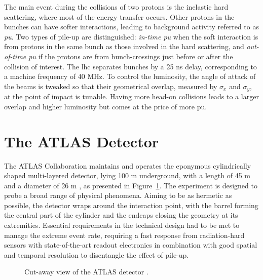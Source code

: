The main event during the collisions of two protons is the inelastic hard scattering, where most of the energy transfer occurs. Other protons in the bunches can have softer interactions, leading to background activity referred to as \textit{\gls{pu}}. Two types of pile-up are distinguished: \textit{in-time \gls{pu}} when the soft interaction is from protons in the same bunch as those involved in the hard scattering, and \textit{out-of-time \gls{pu}} if the protons are from bunch-crossings just before or after the collision of interest. The \gls{lhc} separates bunches by a 25 ns delay, corresponding to a machine frequency of 40 MHz. To control the luminosity, the angle of attack of the beams is tweaked so that their geometrical overlap, measured by $\sigma_x$ and $\sigma_y$, at the point of impact is tunable. Having more head-on collisions leads to a larger overlap and higher luminosity but comes at the price of more \gls{pu}. 

\section{The ATLAS Detector}\label{sec-ATLASDet}
The ATLAS Collaboration maintains and operates the eponymous cylindrically shaped multi-layered detector, lying 100 m underground, with a length of 45 m and a diameter of 26 m \cite{TheATLASCollaboration_2008}, as presented in Figure~\ref{fig-AtlasDec}. The experiment is designed to probe a broad range of physical phenomena. Aiming to be as hermetic as possible, the detector wraps around the interaction point, with the barrel forming the central part of the cylinder and the endcaps closing the geometry at its extremities. Essential requirements in the technical design had to be met to manage the extreme event rate, requiring a fast response from radiation-hard sensors with state-of-the-art readout electronics in combination with good spatial and temporal resolution to disentangle the effect of pile-up.

\begin{figure}[!h]
\centering
\hspace{-1.25cm}
\caption{Cut-away view of the ATLAS detector \cite{ATLASschematics}.}
\label{fig-AtlasDec}
\end{figure}

